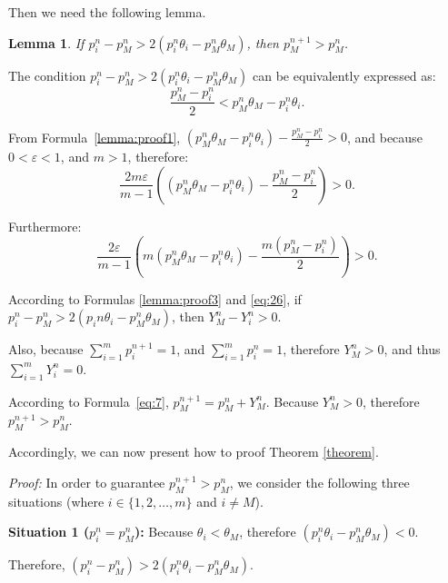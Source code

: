 \documentclass[10pt,journal,cspaper,compsoc,onecolumn]{IEEEtran}
\begin{document}
 Then we need the following lemma.
\newtheorem{lem}{Lemma}
\label{Lemma}
\begin{lem}
  If $p_i^{n} - p_M^{n} > 2(p_i^{n}\theta_i - p_M^{n}\theta_M)$, then $p_M^{n + 1} > p_M^{n}$.
\end{lem}
\begin{IEEEproof}
The condition $p_i^{n} - p_M^{n} > 2(p_i^{n}\theta_i - p_M^{n}\theta_M)$ can be equivalently expressed as:
\begin{equation}
  \label{lemma:proof1}
\displaystyle\frac{p_M^n - p_i^n}{2} < p_M^{n}\theta_M - p_i^{n}\theta_i.
\end{equation}

From Formula~\ref{lemma:proof1},  $(p_M^{n}\theta_M - p_i^{n}\theta_i) - \displaystyle\frac{p_M^n - p_i^n}{2} > 0$, and because $0 < \varepsilon < 1$, and $m > 1$,  therefore:
\begin{equation}
  \label{lemma:proof2}
\displaystyle\frac{2m\varepsilon}{m - 1}((p_M^{n}\theta_M - p_i^{n}\theta_i) - \displaystyle\frac{p_M^n - p_i^n}{2}) > 0.
\end{equation}

Furthermore:
\begin{equation}
  \label{lemma:proof3}
\displaystyle\frac{2\varepsilon}{m - 1}(m(p_M^{n}\theta_M - p_i^{n}\theta_i) - \displaystyle\frac{m(p_M^n - p_i^n)}{2}) > 0.
\end{equation}

According to Formulas \ref{lemma:proof3} and \ref{eq:26},
if $p_i^{n} - p_M^{n} > 2(p_i{n}\theta_i - p_M^{n}\theta_M)$, then
$Y_M^n - Y_i^n > 0$.

Also, because
$\sum_{i=1}^mp_i^{n + 1} = 1$, and
$\sum_{i=1}^mp_i^{n} = 1$, therefore
$Y_M^n >0$, and thus
$\sum_{i=1}^mY_i^n = 0$.

According to Formula~\ref{eq:7},
$p_M^{n + 1} = p_M^n + Y_M^n$.
Because $Y_M^n >0$, therefore
$p_M^{n + 1} > p_M^n$.
\end{IEEEproof}

Accordingly, we can now present how to proof Theorem \ref{theorem}.

\emph{Proof:} In order to guarantee $p_M^{n + 1} > p_M^{n}$, we consider the following three situations (where $i \in \{1, 2, \ldots, m\}$ and $i \ne M$).

\textbf{Situation 1 ($p_i^n = p_M^n$):}
Because $\theta_i < \theta_M$, therefore
$(p_i^n\theta_i - p_M^n\theta_M) < 0$.

Therefore, $(p_i^n - p_M^n) > 2(p_i^n\theta_i - p_M^n\theta_M)$.
\end{document}
